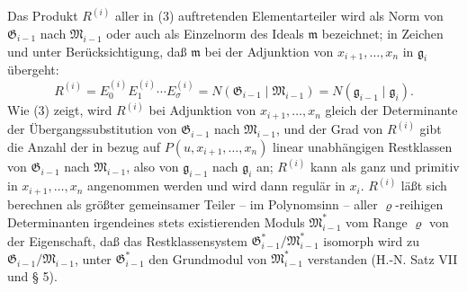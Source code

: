 \documentclass[11pt]{article}
\providecommand{\frakM}{\mathfrak M}
\providecommand{\frakG}{\mathfrak G}
\providecommand{\frakm}{\mathfrak m}
\providecommand{\frakg}{\mathfrak g}
\begin{document}
Das Produkt $R^{(i)}$ aller in (3) auftretenden Elementarteiler wird als Norm von $\frakG_{i-1}$ nach $\frakM_{i-1}$ oder auch als Einzelnorm des Ideals $\frakm$ bezeichnet; in Zeichen und unter Berücksichtigung, daß $\frakm$ bei der Adjunktion von $x_{i+1},\ldots,x_n$ in $\frakg_i$ übergeht:
\begin{equation}
 R^{(i)}=E_0^{(i)}E_1^{(i)}\cdots E_\sigma^{(i)}
 =N(\frakG_{i-1}\mid\frakM_{i-1})=N(\frakg_{i-1}\mid\frakg_i).
\end{equation}
Wie (3) zeigt, wird $R^{(i)}$ bei Adjunktion von $x_{i+1},\ldots,x_n$ gleich der Determinante der Übergangssubstitution von $\frakG_{i-1}$ nach $\frakM_{i-1}$, und der Grad von $R^{(i)}$ gibt die Anzahl der in bezug auf $P(u,x_{i+1},\ldots,x_n)$ linear unabhängigen Restklassen von $\frakG_{i-1}$ nach $\frakM_{i-1}$, also von $\frakg_{i-1}$ nach $\frakg_i$ an; $R^{(i)}$ kann als ganz und primitiv in $x_{i+1},\ldots,x_n$ angenommen werden und wird dann regulär in $x_i$. $R^{(i)}$ läßt sich berechnen als größter gemeinsamer Teiler -- im Polynomsinn -- aller $\varrho$-reihigen Determinanten irgendeines stets existierenden Moduls $\frakM^*_{i-1}$ vom Range $\varrho$ von der Eigenschaft, daß das Restklassensystem $\frakG^*_{i-1}/\frakM^*_{i-1}$ isomorph wird zu $\frakG_{i-1}/\frakM_{i-1}$, unter $\frakG^*_{i-1}$ den Grundmodul von $\frakM^*_{i-1}$ verstanden (H.-N. Satz VII und § 5).
\end{document}
